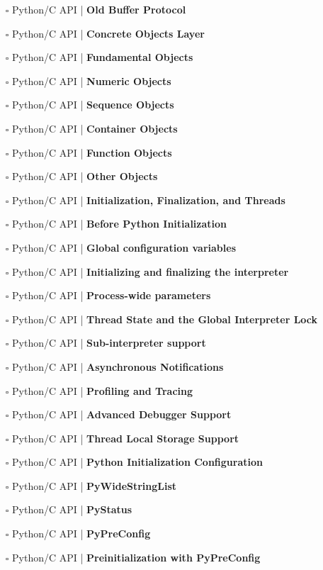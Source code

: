 \documentclass[a4, landscape, 12pt]{article}
\newcommand{\checkbox}{$\square$}%
\begin{document}
\begin{itemize}
{}
\item [\checkbox]  Python/C API | \textbf{ Old Buffer Protocol
}
\item [\checkbox]  Python/C API | \textbf{ Concrete Objects Layer
}
\item [\checkbox]  Python/C API | \textbf{ Fundamental Objects
}
\item [\checkbox]  Python/C API | \textbf{ Numeric Objects
}
\item [\checkbox]  Python/C API | \textbf{ Sequence Objects
}
\item [\checkbox]  Python/C API | \textbf{ Container Objects
}
\item [\checkbox]  Python/C API | \textbf{ Function Objects
}
\item [\checkbox]  Python/C API | \textbf{ Other Objects
}
\item [\checkbox]  Python/C API | \textbf{ Initialization, Finalization, and Threads
}
\item [\checkbox]  Python/C API | \textbf{ Before Python Initialization
}
\item [\checkbox]  Python/C API | \textbf{ Global configuration variables
}
\item [\checkbox]  Python/C API | \textbf{ Initializing and finalizing the interpreter
}
\item [\checkbox]  Python/C API | \textbf{ Process-wide parameters
}
\item [\checkbox]  Python/C API | \textbf{ Thread State and the Global Interpreter Lock
}
\item [\checkbox]  Python/C API | \textbf{ Sub-interpreter support
}
\item [\checkbox]  Python/C API | \textbf{ Asynchronous Notifications
}
\item [\checkbox]  Python/C API | \textbf{ Profiling and Tracing
}
\item [\checkbox]  Python/C API | \textbf{ Advanced Debugger Support
}
\item [\checkbox]  Python/C API | \textbf{ Thread Local Storage Support
}
\item [\checkbox]  Python/C API | \textbf{ Python Initialization Configuration
}
\item [\checkbox]  Python/C API | \textbf{ PyWideStringList
}
\item [\checkbox]  Python/C API | \textbf{ PyStatus
}
\item [\checkbox]  Python/C API | \textbf{ PyPreConfig
}
\item [\checkbox]  Python/C API | \textbf{ Preinitialization with PyPreConfig
}
\end{itemize}
\end{document}
